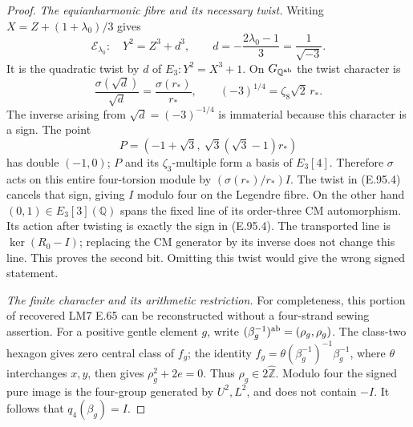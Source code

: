 \begin{proof}
\emph{The equianharmonic fibre and its necessary twist.}
Writing \(X=Z+(1+\lambda_0)/3\) gives
\[
 \mathcal E_{\lambda_0}:\quad Y^2=Z^3+d^3,\qquad
 d=-\frac{2\lambda_0-1}{3}=\frac1{\sqrt{-3}}.
                                                        \tag{E.95.3}
\]
It is the quadratic twist by \(d\) of \(E_3:Y^2=X^3+1\).
On \(G_{\mathbb Q^{\rm ab}}\) the twist character is
\[
 \frac{\sigma(\sqrt d)}{\sqrt d}
   =\frac{\sigma(r_*)}{r_*},\qquad
 (-3)^{1/4}=\zeta_8\sqrt2\,r_*.
                                                        \tag{E.95.4}
\]
The inverse arising from \(\sqrt d=(-3)^{-1/4}\) is immaterial
because this character is a sign.
The point
\[
 P=(-1+\sqrt3,\ \sqrt3(\sqrt3-1)r_*)
\]
has double \((-1,0)\); \(P\) and its \(\zeta_3\)-multiple
form a basis of \(E_3[4]\).  Therefore \(\sigma\) acts on
this entire four-torsion module by
\((\sigma(r_*)/r_*)I\).  The twist in (E.95.4) cancels that
sign, giving \(I\) modulo four on the Legendre fibre.
On the other hand \((0,1)\in E_3[3](\mathbb Q)\) spans the
fixed line of its order-three CM automorphism.  Its action
after twisting is exactly the sign in (E.95.4).  The transported
line is \(\ker(R_0-I)\); replacing the CM generator by its inverse
does not change this line.  This proves the second bit.
Omitting this twist would give the wrong signed statement.

\emph{The finite character and its arithmetic restriction.}
For completeness, this portion of recovered LM7 E.65 can be
reconstructed without a four-strand sewing assertion.
For a positive gentle element \(g\), write
\((\beta_g^{-1})^{\rm ab}=(\rho_g,\rho_g)\).
The class-two hexagon gives zero central class of \(f_g\);
the identity \(f_g=\theta(\beta_g^{-1})^{-1}\beta_g^{-1}\),
where \(\theta\) interchanges \(x,y\), then gives
\(\rho_g^2+2e=0\).  Thus \(\rho_g\in2\widehat{\mathbb Z}\).
Modulo four the signed pure image is the four-group generated
by \(U^2,L^2\), and does not contain \(-I\).
It follows that \(q_4(\beta_g)=I\).


\end{proof}
